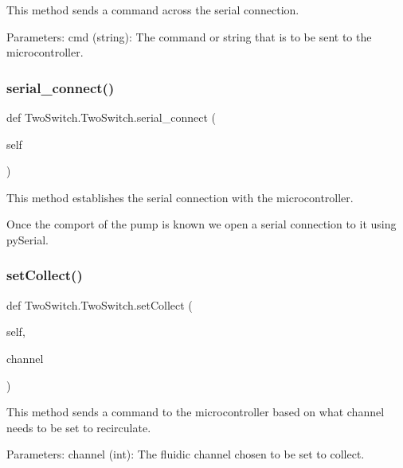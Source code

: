 \begin{DoxyVerb}This method sends a command across the serial connection.

Parameters:
    cmd (string): The command or string that is to be sent to the microcontroller.
\end{DoxyVerb}
 \mbox{\label{class_two_switch_1_1_two_switch_ad816a09389ad0fb8ea56471aa4e8819f}} 
\subsubsection{\texorpdfstring{serial\_connect()}{serial\_connect()}}
{\footnotesize\ttfamily def Two\+Switch.\+Two\+Switch.\+serial\+\_\+connect (\begin{DoxyParamCaption}\item[{}]{self }\end{DoxyParamCaption})}

\begin{DoxyVerb}This method establishes the serial connection with the microcontroller.

Once the comport of the pump is known we open a serial connection to it using pySerial.
\end{DoxyVerb}
 \mbox{\label{class_two_switch_1_1_two_switch_a755481c98e9abd57c5307217df83795b}} 
\subsubsection{\texorpdfstring{setCollect()}{setCollect()}}
{\footnotesize\ttfamily def Two\+Switch.\+Two\+Switch.\+set\+Collect (\begin{DoxyParamCaption}\item[{}]{self,  }\item[{}]{channel }\end{DoxyParamCaption})}

\begin{DoxyVerb}This method sends a command to the microcontroller based on what channel needs to be set to recirculate.

Parameters:
    channel (int): The fluidic channel chosen to be set to collect.
\end{DoxyVerb}
 \mbox{\label{class_two_switch_1_1_two_switch_a9c0f7d8f4a2af542cf574c11a9cee709}} 
